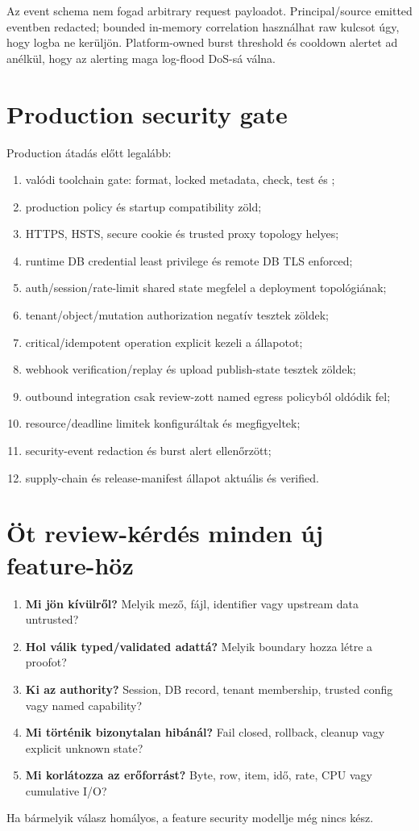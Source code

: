 Az event schema nem fogad arbitrary request payloadot. Principal/source emitted eventben redacted; bounded in-memory correlation használhat raw kulcsot úgy, hogy logba ne kerüljön. Platform-owned burst threshold és cooldown alertet ad anélkül, hogy az alerting maga log-flood DoS-sá válna.

\section{Production security gate}

Production átadás előtt legalább:

\begin{enumerate}
  \item valódi toolchain gate: format, locked metadata, check, test és ;
  \item production policy és startup compatibility zöld;
  \item HTTPS, HSTS, secure cookie és trusted proxy topology helyes;
  \item runtime DB credential least privilege és remote DB TLS enforced;
  \item auth/session/rate-limit shared state megfelel a deployment topológiának;
  \item tenant/object/mutation authorization negatív tesztek zöldek;
  \item critical/idempotent operation explicit kezeli a  állapotot;
  \item webhook verification/replay és upload publish-state tesztek zöldek;
  \item outbound integration csak review-zott named egress policyból oldódik fel;
  \item resource/deadline limitek konfiguráltak és megfigyeltek;
  \item security-event redaction és burst alert ellenőrzött;
  \item supply-chain és release-manifest állapot aktuális és verified.
\end{enumerate}

\section{Öt review-kérdés minden új feature-höz}

\begin{enumerate}
  \item \textbf{Mi jön kívülről?} Melyik mező, fájl, identifier vagy upstream data untrusted?
  \item \textbf{Hol válik typed/validated adattá?} Melyik boundary hozza létre a proofot?
  \item \textbf{Ki az authority?} Session, DB record, tenant membership, trusted config vagy named capability?
  \item \textbf{Mi történik bizonytalan hibánál?} Fail closed, rollback, cleanup vagy explicit unknown state?
  \item \textbf{Mi korlátozza az erőforrást?} Byte, row, item, idő, rate, CPU vagy cumulative I/O?
\end{enumerate}

Ha bármelyik válasz homályos, a feature security modellje még nincs kész.
